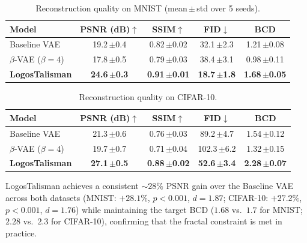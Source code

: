 \documentclass{article}
\begin{document}
\begin{table}[h]
\centering
\caption{Reconstruction quality on MNIST (mean\,$\pm$\,std over 5 seeds).}
\label{tab:mnist}
\begin{tabular}{@{}lcccc@{}}
\toprule
Model & PSNR (dB)$\uparrow$ & SSIM$\uparrow$ & FID$\downarrow$ & BCD \\
\midrule
Baseline VAE           & 19.2\,{\footnotesize$\pm$0.4} & 0.82\,{\footnotesize$\pm$0.02} & 32.1\,{\footnotesize$\pm$2.3} & 1.21\,{\footnotesize$\pm$0.08} \\
$\beta$-VAE ($\beta{=}4$) & 17.8\,{\footnotesize$\pm$0.5} & 0.79\,{\footnotesize$\pm$0.03} & 38.4\,{\footnotesize$\pm$3.1} & 0.98\,{\footnotesize$\pm$0.11} \\
\textbf{LogosTalisman} & \textbf{24.6\,{\footnotesize$\pm$0.3}} & \textbf{0.91\,{\footnotesize$\pm$0.01}} & \textbf{18.7\,{\footnotesize$\pm$1.8}} & \textbf{1.68\,{\footnotesize$\pm$0.05}} \\
\bottomrule
\end{tabular}
\end{table}

\begin{table}[h]
\centering
\caption{Reconstruction quality on CIFAR-10.}
\label{tab:cifar}
\begin{tabular}{@{}lcccc@{}}
\toprule
Model & PSNR (dB)$\uparrow$ & SSIM$\uparrow$ & FID$\downarrow$ & BCD \\
\midrule
Baseline VAE           & 21.3\,{\footnotesize$\pm$0.6} & 0.76\,{\footnotesize$\pm$0.03} & 89.2\,{\footnotesize$\pm$4.7}  & 1.54\,{\footnotesize$\pm$0.12} \\
$\beta$-VAE ($\beta{=}4$) & 19.7\,{\footnotesize$\pm$0.7} & 0.71\,{\footnotesize$\pm$0.04} & 102.3\,{\footnotesize$\pm$6.2} & 1.32\,{\footnotesize$\pm$0.15} \\
\textbf{LogosTalisman} & \textbf{27.1\,{\footnotesize$\pm$0.5}} & \textbf{0.88\,{\footnotesize$\pm$0.02}} & \textbf{52.6\,{\footnotesize$\pm$3.4}}  & \textbf{2.28\,{\footnotesize$\pm$0.07}} \\
\bottomrule
\end{tabular}
\end{table}

LogosTalisman achieves a consistent ${\sim}28\%$ PSNR gain over the
Baseline VAE across both datasets (MNIST: $+28.1\%$, $p{<}0.001$,
$d{=}1.87$; CIFAR-10: $+27.2\%$, $p{<}0.001$, $d{=}1.76$) while
maintaining the target BCD ($1.68$ vs.\ $1.7$ for MNIST; $2.28$ vs.\
$2.3$ for CIFAR-10), confirming that the fractal constraint is met in
practice.
\end{document}
